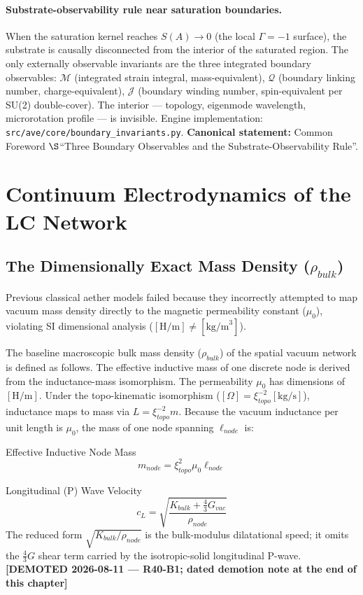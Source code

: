 \paragraph{Substrate-observability rule near saturation boundaries.}
When the saturation kernel reaches $S(A) \to 0$ (the local $\Gamma = -1$\gammaundeclared{}
surface), the substrate is causally disconnected from the interior of the
saturated region. The only externally observable invariants are the three
integrated boundary observables: $\mathcal{M}$ (integrated strain integral,
mass-equivalent), $\mathcal{Q}$ (boundary linking number, charge-equivalent),
$\mathcal{J}$ (boundary winding number, spin-equivalent per SU(2)
double-cover). The interior --- topology, eigenmode wavelength,
microrotation profile --- is invisible. Engine implementation:
\texttt{src/ave/core/boundary\_invariants.py}. \textbf{Canonical statement:}
Common Foreword $\S$``Three Boundary Observables and the
Substrate-Observability Rule''.

\section{Continuum Electrodynamics of the LC Network}
\subsection{The Dimensionally Exact Mass Density ($\rho_{bulk}$)}
Previous classical aether models failed because they incorrectly attempted to map vacuum mass density directly to the magnetic permeability constant ($\mu_0$), violating SI dimensional analysis ($[\text{H/m}] \neq [\text{kg/m}^3]$).

The baseline macroscopic bulk mass density ($\rho_{bulk}$) of the spatial vacuum network is defined as follows. The effective inductive mass of one discrete node is derived from the inductance-mass isomorphism. The permeability $\mu_0$ has dimensions of $[\text{H/m}]$. Under the topo-kinematic isomorphism ($[\Omega] = \xi_{topo}^{-2}[\text{kg/s}]$), inductance maps to mass via $L = \xi_{topo}^{-2} m$. Because the vacuum inductance per unit length is $\mu_0$, the mass of one node spanning $\ell_{node}$ is:
\begin{resultbox}{Effective Inductive Node Mass}
\begin{equation}
    m_{node} = \xi_{topo}^2 \mu_0 \ell_{node}
\end{equation}
\end{resultbox}
\begin{resultbox}{Longitudinal (P) Wave Velocity}
\begin{equation}
    c_L = \sqrt{\frac{K_{bulk} + \tfrac{4}{3}G_{vac}}{\rho_{node}}}
\end{equation}
The reduced form $\sqrt{K_{bulk}/\rho_{node}}$ is the bulk-modulus dilatational speed; it omits the $\tfrac{4}{3}G$ shear term carried by the isotropic-solid longitudinal P-wave. \textbf{[DEMOTED 2026-08-11 --- R40-B1; dated demotion note at the end of this chapter]}
\end{resultbox}


